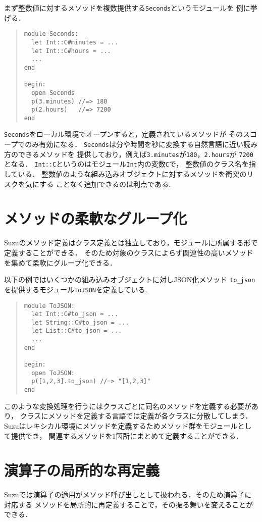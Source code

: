 \documentclass[a4paper,11pt,dvipdfmx]{jreport}
\begin{document}
まず整数値に対するメソッドを複数提供する\verb|Seconds|というモジュールを
例に挙げる．
\begin{quote}
\begin{verbatim}
module Seconds:
  let Int::C#minutes = ...
  let Int::C#hours = ...
  ...
end

begin:
  open Seconds
  p(3.minutes) //=> 180
  p(2.hours)   //=> 7200
end
\end{verbatim}
\end{quote}
\verb|Seconds|をローカル環境でオープンすると，定義されているメソッドが
そのスコープでのみ有効になる．
\verb|Seconds|は分や時間を秒に変換する自然言語に近い読み方のできるメソッドを
提供しており，例えば\verb|3.minutes|が\verb|180|，\verb|2.hours|が
\verb|7200|となる．
\verb|Int::C|というのはモジュール\verb|Int|内の変数\verb|C|で，
整数値のクラス名を指している．
整数値のような組み込みオブジェクトに対するメソッドを衝突のリスクを気にする
ことなく追加できるのは利点である.


\section{メソッドの柔軟なグループ化}

Suzuのメソッド定義はクラス定義とは独立しており，モジュールに所属する形で
定義することができる．
そのため対象のクラスによらず関連性の高いメソッドを集めて柔軟にグループ化できる．

以下の例ではいくつかの組み込みオブジェクトに対しJSON化メソッド
\verb|to_json|を提供するモジュール\verb|ToJSON|を定義している.
\begin{quote}
\begin{verbatim}
module ToJSON:
  let Int::C#to_json = ...
  let String::C#to_json = ...
  let List::C#to_json = ...
  ...
end

begin:
  open ToJSON:
  p([1,2,3].to_json) //=> "[1,2,3]"
end
\end{verbatim}
\end{quote}
このような変換処理を行うにはクラスごとに同名のメソッドを定義する必要があり，
クラスにメソッドを定義する言語では定義が各クラスに分散してしまう．
Suzuはレキシカル環境にメソッドを定義するためメソッド群をモジュールとして提供でき，
関連するメソッドを1箇所にまとめて定義することができる．


\section{演算子の局所的な再定義}

Suzuでは演算子の適用がメソッド呼び出しとして扱われる．そのため演算子に対応する
メソッドを局所的に再定義することで，その振る舞いを変えることができる．
\end{document}
